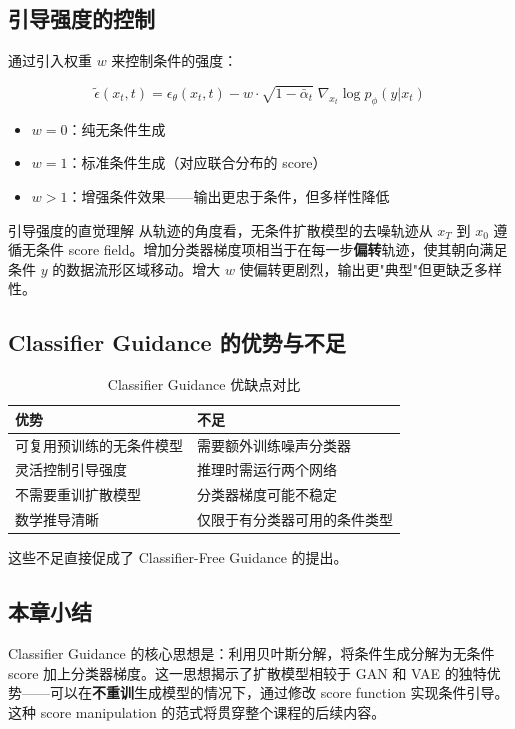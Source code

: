 \subsection{引导强度的控制}

通过引入权重 $w$ 来控制条件的强度：

$$
\tilde{\epsilon}(x_t, t) = \epsilon_\theta(x_t, t) - w\cdot\sqrt{1-\bar\alpha_t}\;\nabla_{x_t}\log p_\phi(y|x_t)
$$

\begin{itemize}
    \item $w = 0$：纯无条件生成
    \item $w = 1$：标准条件生成（对应联合分布的 score）
    \item $w > 1$：增强条件效果——输出更忠于条件，但多样性降低
\end{itemize}

\begin{knowledgebox}{引导强度的直觉理解}
从轨迹的角度看，无条件扩散模型的去噪轨迹从 $x_T$ 到 $x_0$ 遵循无条件 score field。增加分类器梯度项相当于在每一步\textbf{偏转}轨迹，使其朝向满足条件 $y$ 的数据流形区域移动。增大 $w$ 使偏转更剧烈，输出更"典型"但更缺乏多样性。
\end{knowledgebox}

\subsection{Classifier Guidance 的优势与不足}

\begin{table}[H]
\centering
\begin{tabular}{p{6cm}p{6cm}}
\toprule
\textbf{优势} & \textbf{不足} \\
\midrule
可复用预训练的无条件模型 & 需要额外训练噪声分类器 \\
灵活控制引导强度 & 推理时需运行两个网络 \\
不需要重训扩散模型 & 分类器梯度可能不稳定 \\
数学推导清晰 & 仅限于有分类器可用的条件类型 \\
\bottomrule
\end{tabular}
\caption{Classifier Guidance 优缺点对比}
\end{table}

这些不足直接促成了 Classifier-Free Guidance 的提出。

\subsection{本章小结}

Classifier Guidance 的核心思想是：利用贝叶斯分解，将条件生成分解为无条件 score 加上分类器梯度。这一思想揭示了扩散模型相较于 GAN 和 VAE 的独特优势——可以在\textbf{不重训}生成模型的情况下，通过修改 score function 实现条件引导。这种 score manipulation 的范式将贯穿整个课程的后续内容。

\newpage
